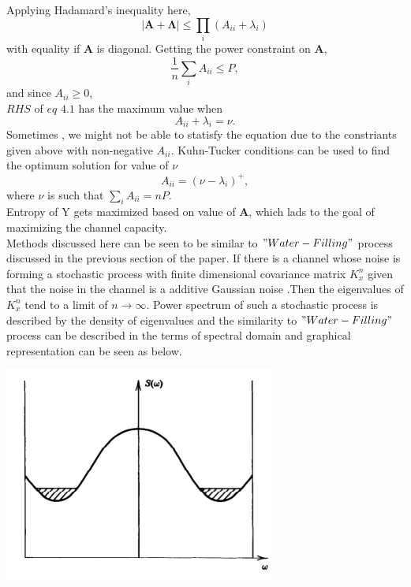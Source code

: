 %
Applying Hadamard's inequality here,
\begin{equation}
|\mathbf{A} + \mathbf{\Lambda}| \leq \prod_i (A_{ii} + \lambda_i)
\tag{4.1}
\end{equation}
with equality if \( \mathbf{A} \) is diagonal. 
\newpage
Getting the power constraint on \( \mathbf{A} \),
\begin{equation}
\frac{1}{n} \sum_i A_{ii} \leq P,
\end{equation}
and since \( A_{ii} \geq 0 \), 
\\
$RHS$ of $eq$ $4.1$ has the maximum value when
\begin{equation}
A_{ii} + \lambda_i = \nu.
\end{equation}
Sometimes , we might not be able to statisfy the equation due to the constriants given above with non-negative \( A_{ii} \).
Kuhn-Tucker conditions can be used to find the optimum solution for value of \( \nu \)
\begin{equation}
A_{ii} = (\nu - \lambda_i)^+,
\end{equation}
where \( \nu \) is such that \( \sum_i A_{ii} = nP \). 
\\
Entropy of Y gets maximized based on value of \( \mathbf{A} \), which lads to the goal of maximizing the channel capacity.
\\
Methods discussed here can be seen to be similar to $"Water-Filling"$ process discussed in the previous section of the paper.
If there is a channel whose noise is forming a stochastic process with finite dimensional covariance matrix \( K_x^n \) given that the noise in the channel is a additive Gaussian noise .Then the eigenvalues of \( K_x^n \) tend to a limit of \( n \to \infty \).
Power spectrum of such a stochastic process is described by the density of eigenvalues and the similarity to $"Water-Filling"$ process can be described in the terms of spectral domain and graphical representation can be seen as below.
\begin{center}
	\includegraphics[scale=0.5]{Diagrams/water_filling_spectral_domain.png}
\end{center} 

